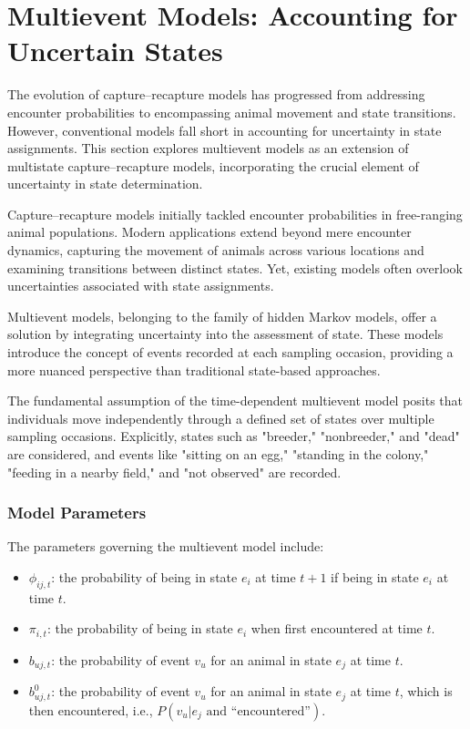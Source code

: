 \documentclass{article}
\begin{document}
\section{Multievent Models: Accounting for Uncertain States}

The evolution of capture–recapture models has progressed from addressing encounter probabilities to encompassing animal movement and state transitions. However, conventional models fall short in accounting for uncertainty in state assignments. This section explores multievent models as an extension of multistate capture–recapture models, incorporating the crucial element of uncertainty in state determination.

Capture–recapture models initially tackled encounter probabilities in free-ranging animal populations. Modern applications extend beyond mere encounter dynamics, capturing the movement of animals across various locations and examining transitions between distinct states. Yet, existing models often overlook uncertainties associated with state assignments.

Multievent models, belonging to the family of hidden Markov models, offer a solution by integrating uncertainty into the assessment of state. These models introduce the concept of events recorded at each sampling occasion, providing a more nuanced perspective than traditional state-based approaches.

The fundamental assumption of the time-dependent multievent model posits that individuals move independently through a defined set of states over multiple sampling occasions. Explicitly, states such as "breeder," "nonbreeder," and "dead" are considered, and events like "sitting on an egg," "standing in the colony," "feeding in a nearby field," and "not observed" are recorded.

\subsubsection*{Model Parameters}

The parameters governing the multievent model include:

\begin{itemize}
    \item $\phi_{ij,t}$: the probability of being in state $e_i$ at time $t + 1$ if being in state $e_i$ at time $t$.
    \item $\pi_{i,t}$: the probability of being in state $e_i$ when first encountered at time $t$.
    \item $b_{uj,t}$: the probability of event $v_u$ for an animal in state $e_j$ at time $t$.
    \item $b_{uj,t}^0$: the probability of event $v_u$ for an animal in state $e_j$ at time $t$, which is then encountered, i.e., $P(v_u | e_j \text{ and “encountered”})$.
\end{itemize}
\end{document}
